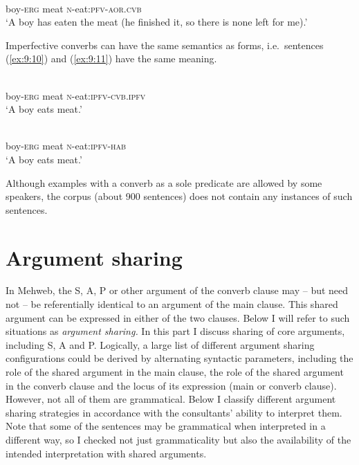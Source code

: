 ﻿\documentclass[output=paper]{langsci/langscibook}
\begin{document}
\ea \label{ex:9:9} %
\\
boy-\textsc{erg} meat \textsc{n}-eat:\textsc{pfv}-\textsc{aor.cvb}\\
\glt `A boy has eaten the meat (he finished it, so there is none left for
me).'
\z

Imperfective converbs can have the same semantics as  forms,
i.e.\ sentences (\ref{ex:9:10}) and (\ref{ex:9:11}) have the same meaning.

\pagebreak[4]

\ea \label{ex:9:10} %
\\
boy-\textsc{erg} meat \textsc{n}-eat:\textsc{ipfv}-\textsc{cvb.ipfv}\\
\glt `A boy eats meat.'

\ex \label{ex:9:11} %
\\
boy-\textsc{erg} meat \textsc{n}-eat:\textsc{ipfv}-\textsc{hab}\\
\glt `A boy eats meat.'
\z

Although examples with a converb as a sole predicate are allowed by some
speakers, the corpus (about 900 sentences) does not contain any instances of such sentences.

\section{Argument sharing}\label{argument-sharing}


In Mehweb, the S, A, P or other argument of the converb clause may –
but need not – be referentially identical to an argument of the main clause. 
This shared argument can be expressed
in either of the two clauses. Below I will refer to such situations as
\emph{argument sharing.} In this part I discuss sharing of core
arguments, including S, A and P. Logically, a large list of different
argument sharing configurations could be derived by alternating
syntactic parameters, including the role of the shared argument in the main
clause, the role of the shared argument in the converb clause and the locus of
its expression (main or converb clause). However, not all of them are grammatical. Below I classify
different argument sharing strategies in accordance with the
consultants' ability to interpret them. Note that some of the sentences
may be grammatical when interpreted in a different way, so I checked not
just grammaticality but also the availability of the intended
interpretation with shared arguments.
\end{document}
